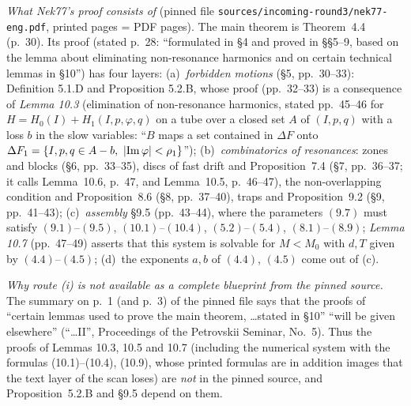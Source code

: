 \begin{remark}\label{bpN:p11:route}
\emph{What Nek77's proof consists of} (pinned file \texttt{sources/incoming-round3/nek77-eng.pdf}, printed pages = PDF pages). The main theorem is Theorem~4.4 (p.~30). Its proof (stated p.~28: ``formulated in \S4 and proved in \S\S5--9, based on the lemma about eliminating non-resonance harmonics and on certain technical lemmas in \S10'') has four layers:
(a)~\emph{forbidden motions} (\S5, pp.~30--33): Definition 5.1.D and Proposition 5.2.B, whose proof (pp.~32--33) is a consequence of \emph{Lemma 10.3} (elimination of non-resonance harmonics, stated pp.~45--46 for $H=H_0(I)+H_1(I,p,\varphi,q)$ on a tube over a closed set $A$ of $(I,p,q)$ with a loss $b$ in the slow variables: ``$B$ maps a set contained in $\Delta F$ onto $\Delta F_1=\{I,p,q\in A-b,\ \abs{\operatorname{Im}\varphi}<\rho_1\}$'');
(b)~\emph{combinatorics of resonances}: zones and blocks (\S6, pp.~33--35), discs of fast drift and Proposition~7.4 (\S7, pp.~36--37; it calls Lemma~10.6, p.~47, and Lemma~10.5, p.~46--47), the non-overlapping condition and Proposition~8.6 (\S8, pp.~37--40), traps and Proposition~9.2 (\S9, pp.~41--43);
(c)~\emph{assembly} \S9.5 (pp.~43--44), where the parameters $(9.7)$ must satisfy $(9.1)$--$(9.5)$, $(10.1)$--$(10.4)$, $(5.2)$--$(5.4)$, $(8.1)$--$(8.9)$; \emph{Lemma 10.7} (pp.~47--49) asserts that this system is solvable for $M<M_0$ with $d,T$ given by $(4.4)$--$(4.5)$;
(d)~the exponents $a,b$ of $(4.4)$, $(4.5)$ come out of (c).

\emph{Why route (i) is not available as a complete blueprint from the pinned source.} The summary on p.~1 (and p.~3) of the pinned file says that the proofs of ``certain lemmas used to prove the main theorem, \dots stated in \S10'' ``will be given elsewhere'' (``\dots II'', Proceedings of the Petrovskii Seminar, No.~5). Thus the proofs of Lemmas 10.3, 10.5 and 10.7 (including the numerical system with the formulas (10.1)--(10.4), (10.9), whose printed formulas are in addition images that the text layer of the scan loses) are \emph{not} in the pinned source, and Proposition~5.2.B and \S9.5 depend on them. 


\end{remark}
